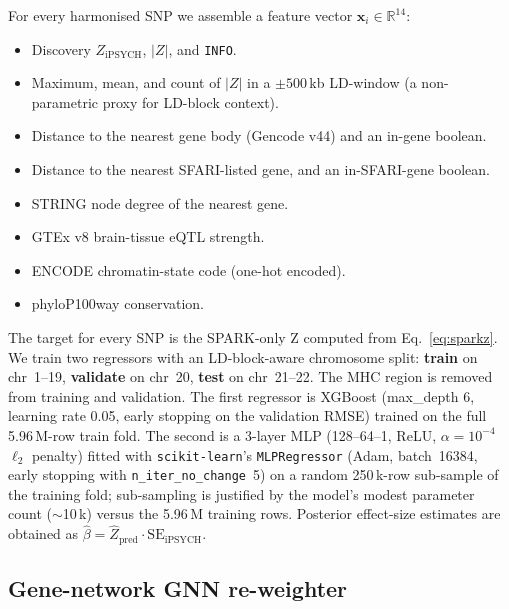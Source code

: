 For every harmonised SNP we assemble a feature vector
$\mathbf{x}_i \in \mathbb{R}^{14}$:
\begin{itemize}[nosep,leftmargin=1.2em]
  \item Discovery $Z_{\mathrm{iPSYCH}}$, $|Z|$, and \texttt{INFO}.
  \item Maximum, mean, and count of $|Z|$ in a $\pm 500$\,kb LD-window
        (a non-parametric proxy for LD-block context).
  \item Distance to the nearest gene body (Gencode v44) and an
        in-gene boolean.
  \item Distance to the nearest SFARI-listed gene, and an in-SFARI-gene
        boolean.
  \item STRING node degree of the nearest gene.
  \item GTEx v8 brain-tissue eQTL strength.
  \item ENCODE chromatin-state code (one-hot encoded).
  \item phyloP100way conservation.
\end{itemize}
The target for every SNP is the SPARK-only Z computed from
Eq.~\ref{eq:sparkz}. We train two regressors with an LD-block-aware
chromosome split: \textbf{train} on chr~1--19, \textbf{validate} on
chr~20, \textbf{test} on chr~21--22. The MHC region is removed from
training and validation. The first regressor is XGBoost (max\_depth 6, learning rate 0.05, early
stopping on the validation RMSE) trained on the full 5.96\,M-row train
fold. The second is a 3-layer MLP (128--64--1, ReLU, $\alpha = 10^{-4}$
$\ell_2$ penalty) fitted with \texttt{scikit-learn}'s
\texttt{MLPRegressor} (Adam, batch~16384, early stopping with
\texttt{n\_iter\_no\_change}~5) on a random 250\,k-row sub-sample of the
training fold; sub-sampling is justified by the model's modest
parameter count ($\sim$10\,k) versus the 5.96\,M training rows.
Posterior effect-size estimates are obtained as
$\hat{\beta} = \hat{Z}_{\mathrm{pred}} \cdot \mathrm{SE}_{\mathrm{iPSYCH}}$.

\subsection{Gene-network GNN re-weighter}
\label{sec:gnn}

